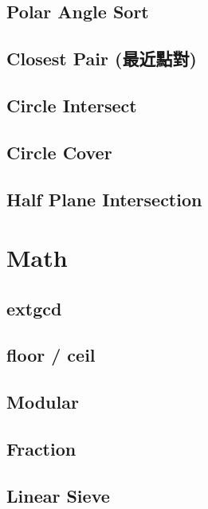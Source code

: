 \subsection{Polar Angle Sort}

\subsection{Closest Pair (最近點對)}

\subsection{Circle Intersect}

\subsection{Circle Cover}

% 
\subsection{Half Plane Intersection}


\section{Math}
\subsection{extgcd}

\subsection{floor / ceil}

\subsection{Modular}

\subsection{Fraction}

\subsection{Linear Sieve}

